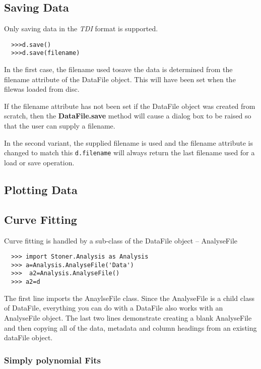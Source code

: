\documentclass[a4paper,11pt]{scrartcl}
\begin{document}
\subsection{Saving Data}

Only saving data in the \textit{TDI} format is supported.

\begin{verbatim}
  >>>d.save()
  >>>d.save(filename)
\end{verbatim}

In the first case, the filename used tosave the data is determined from the filename attribute of the DataFile object. This will have been set when the filewas loaded from disc.

If the filename attribute has not been set \eg if the DataFile object was created from scratch, then the \textbf{DataFile.save} method will cause a dialog box to be raised so that the user can supply a filename.

In the second variant, the supplied filename is used and the filename attribute is changed to match this \ie \verb#d.filename# will always return the last filename used for a load or save operation.

\subsection{Plotting Data}

\subsection{Curve Fitting}

Curve fitting is handled by a sub-class of the DataFile object -- AnalyseFile

\begin{verbatim}
  >>> import Stoner.Analysis as Analysis
  >>> a=Analysis.AnalyseFile('Data')
  >>>  a2=Analysis.AnalyseFile()
  >>> a2=d
\end{verbatim}

The first line imports the AnaylseFile class. Since the AnalyseFile is a child class of DataFile, everything you can do with a DataFile also works with an AnalyseFile object. The last two lines demonstrate creating a blank AnalyseFile and then copying all of the data, metadata and column headings from an existing dataFile object.

\subsubsection{Simply polynomial Fits}
\end{document}
